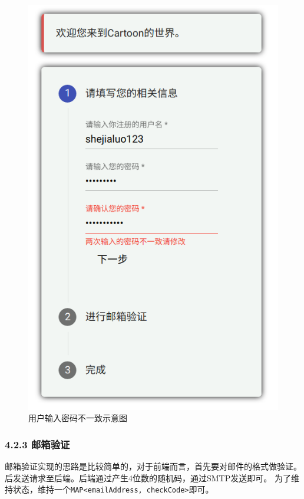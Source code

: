 \documentclass[a4paper,12pt, centering]{ctexart}
\begin{document}
  \begin{figure}[h]
    \centering
    \includegraphics{4.png}
    \caption{用户输入密码不一致示意图}
  \end{figure}

  \subsubsection*{4.2.3 邮箱验证}

  邮箱验证实现的思路是比较简单的，对于前端而言，首先要对邮件的格式做验证。
  后发送请求至后端。后端通过产生4位数的随机码，通过SMTP发送即可。
  为了维持状态，维持一个\verb|MAP<emailAddress, checkCode>|即可。
\end{document}
